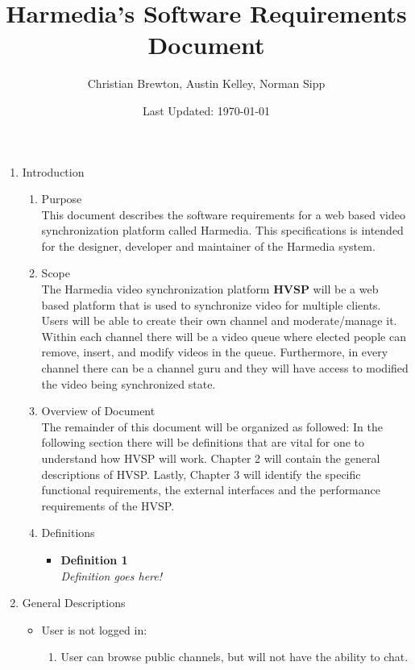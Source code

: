 \documentclass[12pt,a4paper,onesie,titlepage,draft]{article}
\begin{document}
\title{Harmedia's Software Requirements Document}
\author{Christian Brewton, Austin Kelley, Norman Sipp}
\date{Last Updated: \today}
\maketitle

\begin{enumerate}
	\item Introduction
		\begin{enumerate}
			\item Purpose \\
				This document describes the software requirements for a web based video synchronization platform called Harmedia.  This specifications is intended for the designer, developer and maintainer of the Harmedia system.
			\item Scope \\
				The Harmedia video synchronization platform \textbf{HVSP} will be a web based platform that is used to synchronize video for multiple clients.  Users will be able to create their own channel and moderate/manage it.  Within each channel there will be a video queue where elected people can remove, insert, and modify videos in the queue.  Furthermore, in every channel there can be a channel guru and they will have access to modified the video being synchronized state.
			\item Overview of Document \\
				The remainder of this document will be organized as followed: In the following section there will be definitions that are vital for one to understand how HVSP will work.  Chapter 2 will contain the general descriptions of HVSP.  Lastly, Chapter 3  will identify the specific functional requirements, the external interfaces and the performance requirements of the HVSP.
			\item Definitions
				\begin {itemize}
					\item \textbf{Definition 1} \\
						\textit{Definition goes here!}
				\end {itemize}
		\end{enumerate}
	\item General Descriptions
		\begin{itemize}
			\item User is not logged in: \\
			\begin{enumerate}
				\item User can browse public channels, but will not have the ability to chat.

\end{enumerate}
\end{itemize}
\end{enumerate}
\end{document}
